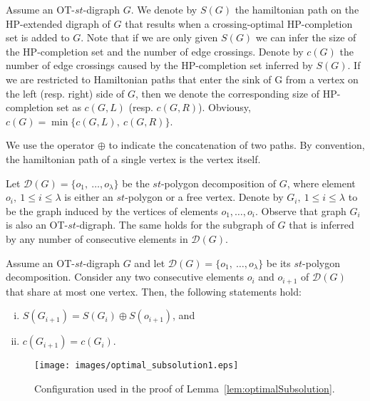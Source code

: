 \documentclass{myllncs-mixalis}
\begin{document}
Assume an OT-$st$-digraph $G$. We denote by $S(G)$ the hamiltonian
path on the HP-extended digraph of $G$ that results when a
crossing-optimal HP-completion set is added to $G$. Note that if we
are only given $S(G)$ we can infer the size of the HP-completion set
and the number of edge crossings. Denote by $c(G)$ the number of
edge crossings caused by the HP-completion set inferred by $S(G)$.
If we are restricted to Hamiltonian paths that enter the sink of G
from a vertex on the left (resp. right) side of $G$, then we denote
the corresponding size of HP-completion set as $c(G,L)$ (resp.
$c(G,R)$). Obviousy, $c(G)= \min \{ c(G,L),~c(G,R) \}$.


We use the operator $\oplus$ to indicate the concatenation of two
paths. By convention, the hamiltonian path of a single vertex is the
vertex itself.


Let $\mathcal{D}(G)= \{ o_1,~ \ldots, o_\lambda \}$ be the
$st$-polygon decomposition of $G$, where element $o_i,~ 1\leq i \leq
\lambda$ is either an $st$-polygon or a free vertex. Denote by
$G_i,~1\leq i \leq \lambda $ to be the graph induced by the vertices
of elements $o_1, \ldots, o_i$. Observe that graph $G_i$ is also an
OT-$st$-digraph. The same holds for the subgraph of $G$ that is
inferred by any number of consecutive elements in $\mathcal{D}(G)$.


\begin{lemma}
\label{lem:optimalSubsolution} Assume an OT-$st$-digraph $G$ and let
$\mathcal{D}(G)= \{ o_1,~ \ldots, o_\lambda \}$ be its $st$-polygon
decomposition. Consider any two consecutive elements $o_i$ and
$o_{i+1}$ of $\mathcal{D}(G)$  that   share at most one vertex.
Then, the following statements hold:\vspace*{-.5cm}
\begin{enumerate}[(i)]
\item $S(G_{i+1})=S(G_i) \oplus S(o_{i+1})$,  and
\item $c(G_{i+1})= c(G_i)$.
\end{enumerate}
\end{lemma}

\begin{figure}[htb]
    \centering
    \texttt{[image: images/optimal\_subsolution1.eps]}
    \caption{Configuration used in the proof of Lemma~\ref{lem:optimalSubsolution}.}
    \label{fig:optimalSubsolution}
\end{figure}
\end{document}
